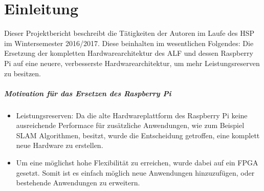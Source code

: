 \chapter{Einleitung}
Dieser Projektbericht beschreibt die Tätigkeiten der Autoren im Laufe des 
\ac{HSP} im Wintersemester 2016/2017. Diese beinhalten im wesentlichen 
Folgendes:
Die Ersetzung der kompletten Hardwarearchitektur des ALF und dessen Raspberry Pi 
auf eine neuere, verbesserste Hardwarearchitektur, um mehr Leistungsreserven zu 
besitzen.

\paragraph{Motivation für das Ersetzen des Raspberry Pi} 
\begin{itemize}
 \item Leistungsreserven: Da die alte Hardwareplattform des Raspberry Pi keine ausreichende Performace für zusätzliche Anwendungen, wie zum Beispiel SLAM Algorithmen, besitzt, wurde die Entscheidung getroffen, eine komplett neue Hardware zu erstellen.
\item Um eine möglichst hohe Flexibilität zu erreichen, wurde dabei auf ein FPGA gesetzt. Somit ist es einfach möglich neue Anwendungen hinzuzufügen, oder bestehende Anwendungen zu erweitern.
\end{itemize}

